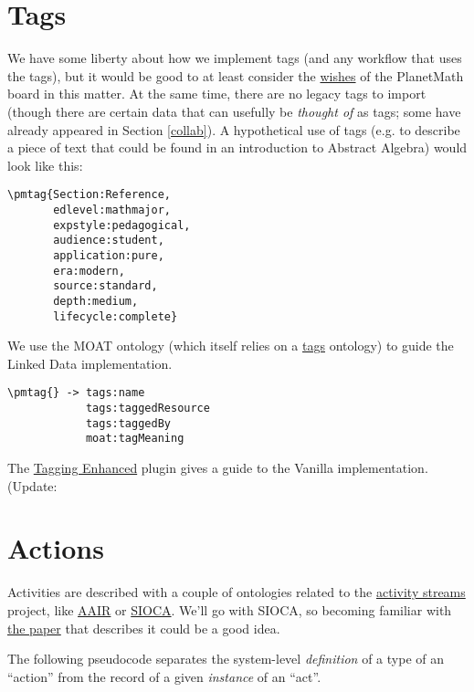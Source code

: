 \documentclass{article}
\begin{document}
\section{Tags} \label{tags}

We have some liberty about how we implement tags (and any
workflow that uses the tags), but it would be good to at
least consider the
\href{http://trac.mathweb.org/planetary/export/HEAD/contrib/planetmath-tags.pdf}{wishes}
of the PlanetMath board in this matter.  At the same time,
there are no legacy tags to import (though there are
certain data that can usefully be \emph{thought of} as
tags; some have already appeared in Section \ref{collab}).
A hypothetical use of tags (e.g. to describe a piece of
text that could be found in an introduction to Abstract
Algebra) would look like this:

\begin{verbatim}
\pmtag{Section:Reference,
       edlevel:mathmajor,
       expstyle:pedagogical,
       audience:student,
       application:pure,
       era:modern,
       source:standard,
       depth:medium,
       lifecycle:complete}
\end{verbatim}

We use the MOAT ontology (which itself relies on a
\href{http://www.holygoat.co.uk/owl/redwood/0.1/tags/}{tags}
ontology) to guide the Linked Data implementation.

\begin{verbatim}
\pmtag{} -> tags:name
            tags:taggedResource
            tags:taggedBy
            moat:tagMeaning
\end{verbatim}

The \href{http://vanillaforums.org/addon/tagging-plugin}{Tagging
  Enhanced} plugin gives a guide to the Vanilla
implementation.  (Update:

\section{Actions} \label{actions}

Activities are described with a couple of ontologies
related to the \href{http://activitystrea.ms}{activity
  streams} project, like
\href{http://xmlns.notu.be/aair/}{AAIR} or
\href{http://rdfs.org/sioc/actions}{SIOCA}.  We'll go with
SIOCA, so becoming familiar with
\href{http://liris.cnrs.fr/Documents/Liris-4573.pdf}{the paper}
that describes it could be a good idea.

The following pseudocode separates the system-level
\emph{definition} of a type of an ``action'' from the
record of a given \emph{instance} of an ``act''.
\end{document}
